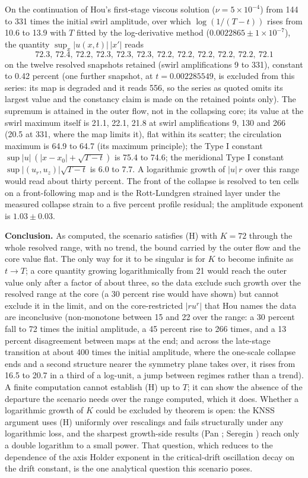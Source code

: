 \documentclass[11pt]{article}
\newcommand{\sn}[2]{#1\times 10^{#2}}
\begin{document}
On the continuation of Hou's first-stage viscous solution ($\nu = \sn{5}{-4}$) from 144 to 331 times the initial swirl amplitude, over which $\log(1 / (T - t))$ rises from 10.6 to 13.9 with $T$ fitted by the log-derivative method ($0.0022865 \pm \sn{1}{-7}$), the quantity $\sup_x |u(x, t)|\,|x'|$ reads
\[
72.3,\ 72.4,\ 72.2,\ 72.3,\ 72.3,\ 72.3,\ 72.2,\ 72.2,\ 72.2,\ 72.2,\ 72.2,\ 72.1
\]
on the twelve resolved snapshots retained (swirl amplifications 9 to 331), constant to 0.42 percent (one further snapshot, at $t = 0.002285549$, is excluded from this series: its map is degraded and it reads 556, so the series as quoted omits its largest value and the constancy claim is made on the retained points only). The supremum is attained in the outer flow, not in the collapsing core; its value at the swirl maximum itself is 21.1, 22.1, 21.8 at swirl amplifications 9, 130 and 266 (20.5 at 331, where the map limits it), flat within its scatter; the circulation maximum is 64.9 to 64.7 (its maximum principle); the Type I constant $\sup |u|\,(|x - x_0| + \sqrt{T - t})$ is 75.4 to 74.6; the meridional Type I constant $\sup |(u_r, u_z)| \sqrt{T - t}$ is 6.0 to 7.7. A logarithmic growth of $|u|\, r$ over this range would read about thirty percent. The front of the collapse is resolved to ten cells on a front-following map and is the Rott-Lundgren strained layer under the measured collapse strain to a five percent profile residual; the amplitude exponent is $1.03 \pm 0.03$.

\medskip
\noindent\textbf{Conclusion.} As computed, the scenario satisfies (H) with $K = 72$ through the whole resolved range, with no trend, the bound carried by the outer flow and the core value flat. The only way for it to be singular is for $K$ to become infinite as $t \to T$; a core quantity growing logarithmically from 21 would reach the outer value only after a factor of about three, so the data exclude such growth over the resolved range at the core (a 30 percent rise would have shown) but cannot exclude it in the limit, and on the core-restricted $|r u^r|$ that Hou names the data are inconclusive (non-monotone between 15 and 22 over the range: a 30 percent fall to 72 times the initial amplitude, a 45 percent rise to 266 times, and a 13 percent disagreement between maps at the end; and across the late-stage transition at about 400 times the initial amplitude, where the one-scale collapse ends and a second structure nearer the symmetry plane takes over, it rises from 16.5 to 20.7 in a third of a log-unit, a jump between regimes rather than a trend). A finite computation cannot establish (H) up to $T$; it can show the absence of the departure the scenario needs over the range computed, which it does. Whether a logarithmic growth of $K$ could be excluded by theorem is open: the KNSS argument uses (H) uniformly over rescalings and fails structurally under any logarithmic loss, and the sharpest growth-side results (Pan \cite{P16}; Seregin \cite{S21}) reach only a double logarithm to a small power. That question, which reduces to the dependence of the axis Holder exponent in the critical-drift oscillation decay on the drift constant, is the one analytical question this scenario poses.
\end{document}
